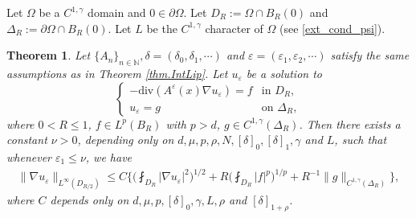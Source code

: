 \documentclass[reqno,12pt]{amsart} %
\newtheorem{theorem}{Theorem}[section]
\theoremstyle{definition}
\theoremstyle{remark}
\numberwithin{equation}{section}
\newcommand{\N}{\mathbb{N}}
\newcommand{\e}{\varepsilon}
\begin{document}
Let $\Omega$ be a $C^{1,\gamma}$ domain and $0\in \partial \Omega$. Let $D_R := \Omega \cap B_R(0)$ and $\Delta_R := \partial \Omega \cap B_R(0)$. Let $L$ be the $C^{1,\gamma}$ character of $\Omega$ (see \eqref{ext_cond_psi}).
\begin{theorem}\label{thm.BdryLip}
    Let $\{ A_n \}_{n\in \N}, \delta = (\delta_0, \delta_1,\cdots)$ and $\e = (\e_1, \e_2, \cdots )$ satisfy the same assumptions as in Theorem \ref{thm.IntLip}.
    Let $u_\varepsilon$ be a solution to 
    \begin{equation}\label{eq_bdryint}
    \begin{cases}
        -\mathrm{div}(A^{\varepsilon}(x)\nabla u_\varepsilon)=f&\text{in } D_R,\\
        u_\varepsilon=g& \text{on } \Delta_R,
   \end{cases}
\end{equation}
    where $0<R\leq 1$, $f\in L^p(B_{R})$ with $p>d$, $g\in C^{1, \gamma}(\Delta_R)$. Then there exists a constant $\nu>0$, depending only on $d, \mu, p, \rho, N, [\delta]_0, [\delta]_1, \gamma $ and $L$, such that whenever $\varepsilon_1\leq \nu$,  we have
  \begin{align*}
    \| \nabla u_\e \|_{L^\infty(D_{R/2})} \leq C\bigg\{\bigg(\fint_{D_{R}}|\nabla u_\varepsilon|^2\bigg)^{1/2}+R\bigg(\fint_{D_{R}}|f|^p\bigg)^{1/p}+R^{-1}\|g\|_{C^{1, \gamma}(\Delta_R)}\bigg\},
  \end{align*}
  where $C$ depends only on $d, \mu, p, [\delta]_0, \gamma, L, \rho$ and $[\delta]_{1+\rho}$. 
\end{theorem}
\end{document}
